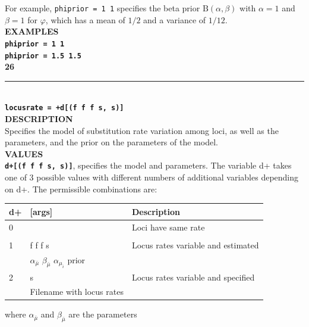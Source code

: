 \documentclass[a4paper]{book}
\numberwithin{equation}{section} \renewcommand{\baselinestretch}{0.55}
\begin{document}
For example, \texttt{phiprior = 1 1} specifies the beta prior
$\textrm{B}(\alpha,\beta)$ with $\alpha = 1$ and $\beta
= 1$ for  $\varphi$, which has a mean of $1/2$ and a variance of $1/12$. \vspace{5pt}\\
\textbf{EXAMPLES} \vspace{5pt}\\
\textbf{\texttt{phiprior = 1 1}} \vspace{5pt}\\
\textbf{\texttt{phiprior = 1.5 1.5}}\vspace{10pt}\\
\textbf{{\large 26}} \\
\noindent\rule{\textwidth}{0.8pt} \\
\textbf{{\Large \texttt{locusrate = +d[(f f f s, s)]}}} \vspace{5pt}\\
\textbf{DESCRIPTION} \vspace{5pt}\\
Specifies the model of substitution rate variation among loci, as well
as the parameters, and the prior on the parameters of the model.
\vspace{5pt}\\
\textbf{VALUES} \vspace{5pt}\\
\textbf{\texttt{d+[(f f f s, s)]}}, specifies the model and
parameters. The variable d+ takes one of 3 possible values with
different numbers of additional variables depending on d+. The
permissible combinations are:
\begin{table}[H]
  \begin{tabular}{@{}lll@{}}
    \toprule
    \textbf{d+} & \textbf{{[}args{]}}  & \textbf{Description} \\ \midrule
    0 &  & Loci have same rate \\
                &  &  \\
    1 & f f f s & Locus rates variable and estimated \\
                & $\alpha_{\bar{\mu}} \,\, \beta_{\bar{\mu}} \,\, \alpha_{\mu_i}$ prior & \\
    2 & s & Locus rates variable and specified \\ 
                & Filename with locus rates & \\ \bottomrule
  \end{tabular}
\end{table}
\noindent
where $\alpha_{\bar{\mu}}$ and $\beta_{\bar{\mu}}$ are the parameters
\end{document}
